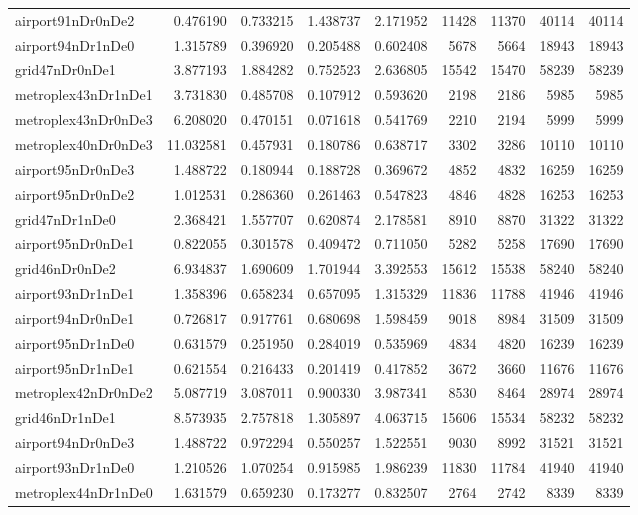 \begin{longtable}{|l|r|r|r|r|r|r|r|r|}
airport91nDr0nDe2 & 0.476190 & 0.733215 & 1.438737 & 2.171952 & 11428 & 11370 & 40114 & 40114 \\
airport94nDr1nDe0 & 1.315789 & 0.396920 & 0.205488 & 0.602408 & 5678 & 5664 & 18943 & 18943 \\
grid47nDr0nDe1 & 3.877193 & 1.884282 & 0.752523 & 2.636805 & 15542 & 15470 & 58239 & 58239 \\
metroplex43nDr1nDe1 & 3.731830 & 0.485708 & 0.107912 & 0.593620 & 2198 & 2186 & 5985 & 5985 \\
metroplex43nDr0nDe3 & 6.208020 & 0.470151 & 0.071618 & 0.541769 & 2210 & 2194 & 5999 & 5999 \\
metroplex40nDr0nDe3 & 11.032581 & 0.457931 & 0.180786 & 0.638717 & 3302 & 3286 & 10110 & 10110 \\
airport95nDr0nDe3 & 1.488722 & 0.180944 & 0.188728 & 0.369672 & 4852 & 4832 & 16259 & 16259 \\
airport95nDr0nDe2 & 1.012531 & 0.286360 & 0.261463 & 0.547823 & 4846 & 4828 & 16253 & 16253 \\
grid47nDr1nDe0 & 2.368421 & 1.557707 & 0.620874 & 2.178581 & 8910 & 8870 & 31322 & 31322 \\
airport95nDr0nDe1 & 0.822055 & 0.301578 & 0.409472 & 0.711050 & 5282 & 5258 & 17690 & 17690 \\
grid46nDr0nDe2 & 6.934837 & 1.690609 & 1.701944 & 3.392553 & 15612 & 15538 & 58240 & 58240 \\
airport93nDr1nDe1 & 1.358396 & 0.658234 & 0.657095 & 1.315329 & 11836 & 11788 & 41946 & 41946 \\
airport94nDr0nDe1 & 0.726817 & 0.917761 & 0.680698 & 1.598459 & 9018 & 8984 & 31509 & 31509 \\
airport95nDr1nDe0 & 0.631579 & 0.251950 & 0.284019 & 0.535969 & 4834 & 4820 & 16239 & 16239 \\
airport95nDr1nDe1 & 0.621554 & 0.216433 & 0.201419 & 0.417852 & 3672 & 3660 & 11676 & 11676 \\
metroplex42nDr0nDe2 & 5.087719 & 3.087011 & 0.900330 & 3.987341 & 8530 & 8464 & 28974 & 28974 \\
grid46nDr1nDe1 & 8.573935 & 2.757818 & 1.305897 & 4.063715 & 15606 & 15534 & 58232 & 58232 \\
airport94nDr0nDe3 & 1.488722 & 0.972294 & 0.550257 & 1.522551 & 9030 & 8992 & 31521 & 31521 \\
airport93nDr1nDe0 & 1.210526 & 1.070254 & 0.915985 & 1.986239 & 11830 & 11784 & 41940 & 41940 \\
metroplex44nDr1nDe0 & 1.631579 & 0.659230 & 0.173277 & 0.832507 & 2764 & 2742 & 8339 & 8339 \\

\end{longtable}
